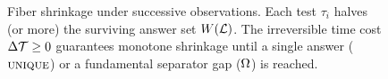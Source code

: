 \begin{figure}[htbp]
\caption{Fiber shrinkage under successive observations.
  Each test $\tau_i$ halves (or more) the surviving answer set $W(\mathcal{L})$.
  The irreversible time cost $\Delta\mathcal{T} \geq 0$ guarantees monotone shrinkage
  until a single answer ($\textsc{unique}$) or a fundamental separator gap ($\Omega$) is reached.}
\label{fig:fiber-shrinkage}
\end{figure}
